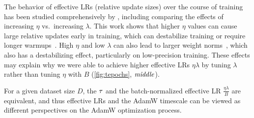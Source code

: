 The behavior of effective LRs (relative update sizes) over the course
of training has been studied comprehensively
by \citet{kosson2023rotational}, including comparing the effects of
increasing $\eta$ vs.\ increasing $\lambda$.
%
This work shows that higher $\eta$ values can cause large relative
updates early in training, which can destabilize training or require
longer warmups~\citep{kosson2024analyzing}.
%
High $\eta$ and low $\lambda$ can also lead to larger weight
norms~\citep{kosson2023rotational,dangelo2024why}, which also has a
destabilizing effect, particularly on low-precision training.
%
These effects may explain why we were able to achieve higher effective
LRs $\eta\lambda$ by tuning $\lambda$ rather than tuning $\eta$ with
$B$ (\cref{fig:tepochs}, $\text{\emph{middle}}$).

For a given dataset size $D$, the $\tau$ and the batch-normalized
effective LR $\frac{\eta\lambda}{B}$ are equivalent, and thus
effective LRs and the AdamW timescale can be viewed as different
perspectives on the AdamW optimization process.
